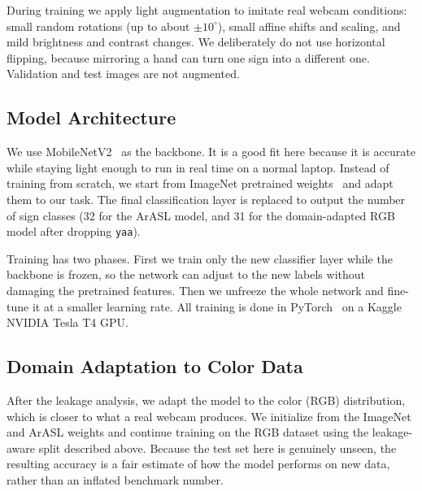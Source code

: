 During training we apply light augmentation to imitate real webcam conditions: small
random rotations (up to about $\pm10^\circ$), small affine shifts and scaling, and
mild brightness and contrast changes. We deliberately do not use horizontal
flipping, because mirroring a hand can turn one sign into a different one.
Validation and test images are not augmented.

\subsection{Model Architecture}
We use MobileNetV2~\cite{sandler2018mobilenetv2} as the backbone. It is a good fit
here because it is accurate while staying light enough to run in real time on a
normal laptop. Instead of training from scratch, we start from ImageNet pretrained
weights~\cite{deng2009imagenet} and adapt them to our task. The final classification
layer is replaced to output the number of sign classes (32 for the ArASL model, and
31 for the domain-adapted RGB model after dropping \texttt{yaa}).

Training has two phases. First we train only the new classifier layer while the
backbone is frozen, so the network can adjust to the new labels without damaging the
pretrained features. Then we unfreeze the whole network and fine-tune it at a smaller
learning rate. All training is done in PyTorch~\cite{paszke2019pytorch} on a Kaggle
NVIDIA Tesla T4 GPU.

\subsection{Domain Adaptation to Color Data}
After the leakage analysis, we adapt the model to the color (RGB) distribution,
which is closer to what a real webcam produces. We initialize from the ImageNet and
ArASL weights and continue training on the RGB dataset using the leakage-aware split
described above. Because the test set here is genuinely unseen, the resulting
accuracy is a fair estimate of how the model performs on new data, rather than an
inflated benchmark number.

